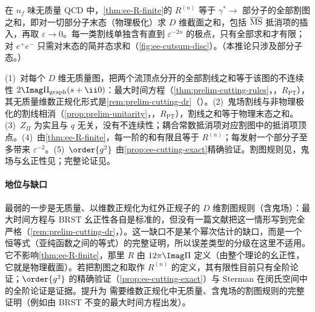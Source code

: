 \begin{corollary}\label{cor:ee-cuts}
在 $n_f$ 味无质量 QCD 中，\cref{thm:ee-R-finite}的 $R^{(n)}$ 等于 $\gamma^*\to$ 部分子的全部割图之和，即对一切部分子末态（物理极化）求 $D$ 维截面之和，包括 $\overline{\rm MS}$ 抵消项的插入，再取 $\varepsilon\to0$。每一类割线单独含有直到 $\varepsilon^{-2n}$ 的极点，只有全部求和才有限；对 $e^+e^-$ 只需对末态的简并态求和（\cref{fig:ee-cutsum-disc}）。（本推论只涉及部分子态。）
\end{corollary}
\begin{proofsketch}
(1)~对每个 $D$ 维无质量图，把两个流顶点分开的全部割线之和等于该图的不连续性 $2\Imag\Pi_{\rm graph}(s+\ii0)$：最大时间方程（\cref{thm:prelim-cutting-rules}，\tagR，$R_{\mathrm{PT}}$），其无质量维数正规化形式是\cref{rem:prelim-cutting-dr}（\tagA）。(2)~鬼场割线与非物理极化的割线相消（\cref{prop:prelim-unitarity}，\tagR，$R_{\mathrm{PT}}$），割线之和等于物理末态之和。(3)~$Z_\Pi$ 为实且与 $q$ 无关，没有不连续性；耦合常数抵消项对应割图中的抵消项顶点。(4)~由\cref{thm:ee-R-finite}，每一阶的和有限且等于 $R^{(n)}$；每发射一个部分子至多带来 $\varepsilon^{-2}$。(5)~$\order{g^2}$ 由\cref{prop:ee-cutting-exact}精确验证。割图规则见\cite{Cutkosky1960,Veltman1963,tHooftVeltman1974}，鬼场与幺正性见\cite{tHooftVeltman1972b,KugoOjima1979}；完整论证见\cite{Sterman1978a,Sterman1978b}。
\end{proofsketch}

\paragraph{地位与缺口}最弱的一步是无质量、以维数正规化为红外正规子的 $D$ 维割图规则（含鬼场）：最大时间方程与 BRST 幺正性各自是标准的，但没有一篇文献把这一情形写到完全严格（\cref{rem:prelim-cutting-dr}，\tagA）。这一缺口不是某个幂次估计的缺口，而是一个恒等式（亚纯函数之间的等式）的完整证明，所以误差类型的分级在这里不适用。它不影响\cref{thm:ee-R-finite}，那里 $R$ 由 $12\pi\Imag\Pi$ 定义（由整个理论的幺正性，它就是物理截面）。若把割图之和取作 $R^{(n)}$ 的定义，其有限性目前只有全阶论证；$\order{g^2}$ 的精确验证（\cref{prop:ee-cutting-exact}）与 Sterman 在闵氏空间中的全阶论证\cite{Sterman1978a,Sterman1978b}是证据。提升为 \tagR 需要维数正规化中无质量、含鬼场的割图规则的完整证明（例如由 BRST 不变的最大时间方程出发）。
